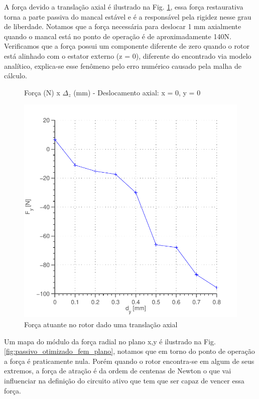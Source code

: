 A força devido a translação axial é ilustrado na Fig. \ref{fig:forca:passivo:otimizado:fem:dy}, essa força restaurativa torna a parte passiva do mancal estável e é a responsável pela rigidez nesse grau de liberdade. Notamos que a força necessária para deslocar 1 mm axialmente quando o mancal está no ponto de operação é de aproximadamente 140N. Verificamos que a força possui um componente diferente de zero quando o rotor está alinhado com o estator externo (z = 0), diferente do encontrado via  modelo analítico, explica-se esse fenômeno pelo erro numérico causado pela malha de cálculo.

\begin{figure}[!ht]
	\centering
	\caption*{Força (N) x $\Delta_z$ (mm) - Deslocamento axial: x = 0, y = 0}
	\includegraphics[width=0.6 \columnwidth,angle=0]{Figs/Simulacoes/Passivo2/fem/passivo_otimizado_fem_dy}
	\caption{Força atuante no rotor dado uma translação axial}
	\label{fig:forca:passivo:otimizado:fem:dy}
\end{figure}

Um mapa do módulo da força radial no plano x,y é ilustrado na Fig. \ref{fig:passivo_otimizado_fem_plano}, notamos que em torno do ponto de operação a força é praticamente nula. Porém quando o rotor encontra-se em algum de seus extremos, a força de atração é da ordem de centenas de Newton o que vai influenciar na definição do circuito ativo que tem que ser capaz de vencer essa força.

